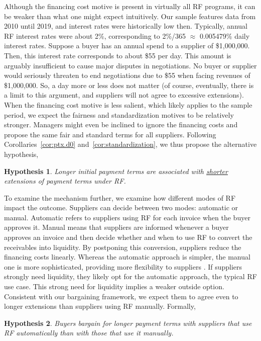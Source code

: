 \documentclass[a4paper,11pt]{article}
\renewcommand{\~}[1]{\tilde{#1}}
\renewcommand{\-}[1]{\overline{#1}}
\newtheorem{hypothesis}{Hypothesis}
\newcounter{pretheorem}
\newcommand{\theoremgroup}{\refstepcounter{pretheorem}}
\begin{document}
Although the financing cost motive is present in virtually all RF programs, it can be weaker than what one might expect intuitively. Our sample features data from 2010 until 2019, and interest rates were historically low then. Typically, annual RF interest rates were about 2\%, corresponding to 2\%/365 $\approx$ 0.005479\%  daily interest rates. Suppose a buyer has an annual spend to a supplier of \$1,000,000. Then, this interest rate corresponds to about \$55 per day. This amount is arguably insufficient to cause major disputes in negotiations. No buyer or supplier would seriously threaten to end negotiations due to \$55 when facing revenues of \$1,000,000. So, a day more or less does not matter (of course, eventually, there is a limit to this argument, and suppliers will not agree to excessive extensions). When the financing cost motive is less salient, which likely applies to the sample period, we expect the fairness and standardization motives to be relatively stronger. Managers might even be inclined to ignore the financing costs and propose the same fair and standard terms for all suppliers. Following Corollaries~\ref{cor:ptx.d0} and~\ref{cor:standardization}, we thus propose the alternative hypothesis,
\begin{hypothesis}\label{H:d0.neg}\singlespacing
Longer initial payment terms are associated with \underline{shorter} extensions of payment terms under RF. 
\end{hypothesis}
To examine the mechanism further, we examine how different modes of RF impact the outcome. Suppliers can decide between two modes: automatic or manual. Automatic refers to suppliers using RF for each invoice when the buyer approves it. Manual means that suppliers are informed whenever a buyer approves an invoice and then decide whether and when to use RF to convert the receivables into liquidity. By postponing this conversion, suppliers reduce the financing costs linearly. Whereas the automatic approach is simpler, the manual one is more sophisticated, providing more flexibility to suppliers \citep{Grueter2017}. If suppliers strongly need liquidity, they likely opt for the automatic approach, the typical RF use case. This strong need for liquidity implies a weaker outside option. Consistent with our bargaining framework, we expect them to agree even to longer extensions than suppliers using RF manually. Formally,%
\theoremgroup%
\begin{hypothesis}\label{H:mode:direct}\singlespacing
Buyers bargain for longer payment terms with suppliers that use RF automatically than with those that use it manually.
\end{hypothesis}
\end{document}

